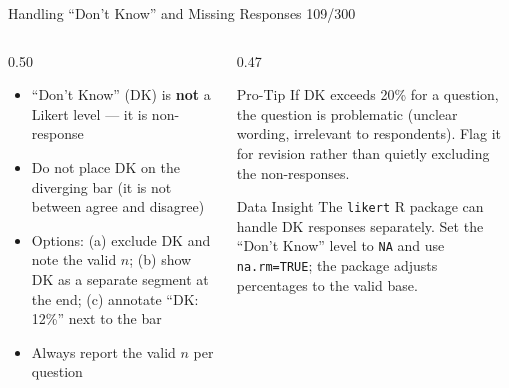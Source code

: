 \documentclass[10pt]{beamer}
\newcommand{\smark}[1]{\hfill{\scriptsize\color{codegray}#1}}
\begin{document}
\begin{frame}{Handling ``Don't Know'' and Missing Responses}
\smark{109/300}
\begin{columns}[T]
\begin{column}{0.50\textwidth}
\begin{itemize}
    \item ``Don't Know'' (DK) is \textbf{not} a Likert level --- it is non-response
    \item Do not place DK on the diverging bar (it is not between agree and disagree)
    \item Options: (a) exclude DK and note the valid $n$; (b) show DK as a separate segment at the end; (c) annotate ``DK: 12\%'' next to the bar
    \item Always report the valid $n$ per question
\end{itemize}
\end{column}
\begin{column}{0.47\textwidth}
\begin{alertblock}{Pro-Tip}
    \scriptsize If DK exceeds 20\% for a question, the question is problematic (unclear wording, irrelevant to respondents). Flag it for revision rather than quietly excluding the non-responses.
\end{alertblock}
\vspace{0.1cm}
\begin{exampleblock}{Data Insight}
    \scriptsize The \texttt{likert} R package can handle DK responses separately. Set the ``Don't Know'' level to \texttt{NA} and use \texttt{na.rm=TRUE}; the package adjusts percentages to the valid base.
\end{exampleblock}
\end{column}
\end{columns}
\end{frame}
\end{document}
